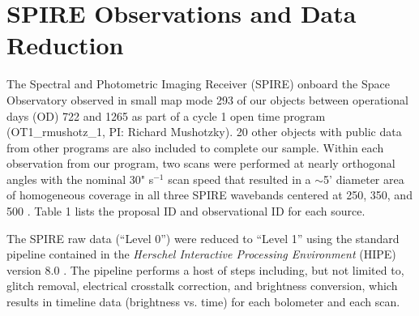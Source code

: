 \section{\herschel{} SPIRE Observations and Data Reduction}\label{obs}
The Spectral and Photometric Imaging Receiver (SPIRE) \citep{Griffin:2010sf} onboard the \herschel{} Space Observatory \citep{Pilbratt:2010rz} observed in small map mode 293 of our objects between operational days (OD) 722 and 1265 as part of a cycle 1 open time program (OT1\_rmushotz\_1, PI: Richard Mushotzky). 20 other objects with public data from other programs are also included to complete our sample. Within each observation from our program, two scans were performed at nearly orthogonal angles with the nominal 30" s$^{-1}$ scan speed that resulted in a $\sim$5' diameter area of homogeneous coverage in all three SPIRE wavebands centered at 250, 350, and 500 \um. Table 1 lists the proposal ID and observational ID for each source.

The SPIRE raw data (``Level 0'') were reduced to ``Level 1'' using the standard pipeline contained in the \textit{Herschel Interactive Processing Environment} (HIPE) version 8.0 \citep{Ott:2010rm}. The pipeline performs a host of steps including, but not limited to, glitch removal, electrical crosstalk correction, and brightness conversion, which results in timeline data (brightness vs. time) for each bolometer and each scan. 